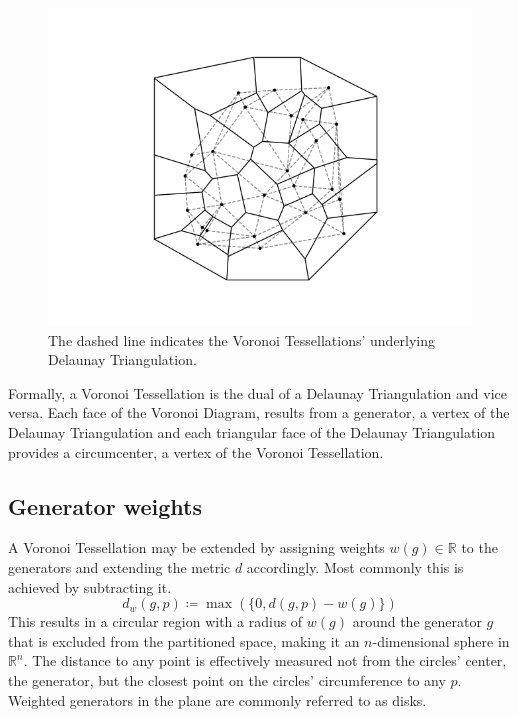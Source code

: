 \documentclass[a4paper]{article}
\begin{document}
\begin{figure}[H]
	\includegraphics[width=\textwidth]{delaunay_triangulation.png}
	\caption{The dashed line indicates the Voronoi Tessellations' underlying Delaunay Triangulation.}
\end{figure}

Formally, a Voronoi Tessellation is the dual of a Delaunay Triangulation and vice versa. Each face of the
Voronoi Diagram, results from a generator, a vertex of the Delaunay Triangulation and each triangular
face of the Delaunay Triangulation provides a circumcenter, a vertex of the Voronoi Tessellation.

\subsection{Generator weights}
A Voronoi Tessellation may be extended by assigning weights \(w(g) \in \mathbb{R}\) to the generators and
extending the metric \(d\) accordingly. Most commonly this is achieved by subtracting it.
\[d_w(g, p) \coloneqq \max(\{0, d(g, p) - w(g)\})\]
This results in a circular region with a radius of \(w(g)\) around the generator \(g\)
that is excluded from the partitioned space, making it an \(n\)-dimensional sphere in \(\mathbb{R}^n\).
The distance to any point is effectively measured not from the circles' center, the generator,
but the closest point on the circles' circumference to any \(p\).
Weighted generators in the plane are commonly referred to as disks.
\end{document}
